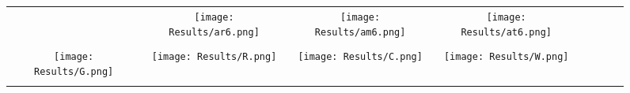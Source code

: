 \documentclass[journal]{IEEEtran}
\begin{document}
\begin{figure*}[!t]
\begin{tabular}{cccccccc}
		&
		\hspace{0.4cm}
		\begin{minipage}{30pt}
			\texttt{[image: Results/ar6.png]}
			\centering{(f)}
		\end{minipage}
		&
		\hspace{0.4cm}
		\begin{minipage}{30pt}
			\texttt{[image: Results/am6.png]}
			\centering{(g)}
		\end{minipage}
		&
		\hspace{0.4cm}
		\begin{minipage}{30pt}
			\texttt{[image: Results/at6.png]}
			\centering{(h)}
		\end{minipage}
		\\
		\\
			\begin{minipage}{30pt}
			\texttt{[image: Results/G.png]}
\end{minipage}
		&
		\hspace{0.4cm}
		\begin{minipage}{30pt}
			\texttt{[image: Results/R.png]}
\end{minipage}
		&
		\hspace{0.4cm}
		\begin{minipage}{30pt}
			\texttt{[image: Results/C.png]}
\end{minipage}
		&
		\hspace{0.4cm}
		\begin{minipage}{30pt}
			\texttt{[image: Results/W.png]}
\end{minipage}
		&
		\hspace{0.4cm}
		\begin{minipage}{30pt}
\end{minipage}
		&
		\hspace{0.4cm}
		\begin{minipage}{30pt}
\end{minipage}
		&
		\hspace{0.4cm}
		\begin{minipage}{30pt}
\end{minipage}
		&
	
		\hspace{0.4cm}
		\begin{minipage}{30pt}
\end{minipage}
		\\
		\\


\end{tabular}
\end{figure*}
\end{document}
